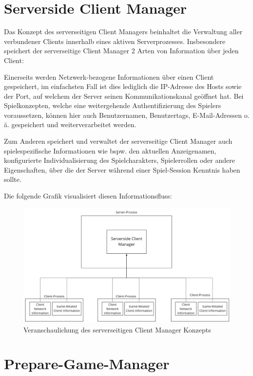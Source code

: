 \section{Serverside Client Manager}

\label{serverside_client_manager}

Das Konzept des serverseitigen Client Managers beinhaltet die Verwaltung aller verbundener Clients innerhalb eines aktiven Serverprozesses. Insbesondere speichert der serverseitige Client Manager 2 Arten von Information über jeden Client:

Einerseits werden Netzwerk-bezogene Informationen über einen Client gespeichert, im einfachsten Fall ist dies lediglich die IP-Adresse des Hosts sowie der Port, auf welchem der Server seinen Kommunikationskanal geöffnet hat. Bei Spielkonzepten, welche eine weitergehende Authentifizierung des Spielers voraussetzen, können hier auch Benutzernamen, Benutzertags, E-Mail-Adressen o. ä. gespeichert und weiterverarbeitet werden.

Zum Anderen speichert und verwaltet der serverseitige Client Manager auch spielespezifische Informationen wie bspw. den aktuellen Anzeigenamen, konfigurierte Individualisierung des Spielcharakters, Spielerrollen oder andere Eigenschaften, über die der Server während einer Spiel-Session Kenntnis haben sollte.

Die folgende Grafik visualisiert diesen Informationsfluss:

\begin{figure}[H]
	\centering
	\includegraphics[width=150mm]{images/serversided_client_manager.jpg}
	\caption[Serversided Client Manager]{Veranschaulichung des serverseitigen Client Manager Konzepts}
	\label{pic:serversided_client_manager}
\end{figure}

\section{Prepare-Game-Manager}


